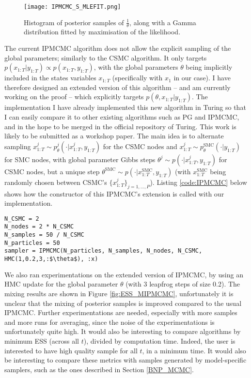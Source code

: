 \begin{figure}[h!]
\centering
\texttt{[image: IPMCMC\_S\_MLEFIT.png]}
    \caption{Histogram of posterior samples of $\frac{1}{\theta}$, along with a Gamma distribution fitted by maximisation of the likelihood.}
    \label{fig:IPMCMC_S_MLEFIT}
\end{figure}

The current \gls{IPMCMC} algorithm \cite{Rainforth:2016wq} does not allow the explicit sampling of the global parameters; similarly to the \acrlong{CSMC} algorithm. It only targets $ p(x_{1:T}|y_{1:T}) \propto p(x_{1:T},y_{1:T})$, with the global parameters $\theta$ being implicitly included in the states variables $x_{1:T}$ (specifically with $x_1$ in our case). I have therefore designed an extended version of this algorithm -- and am currently working on the proof -- which explicitly targets $p(\theta, x_{1:T}|y_{1:T})$. The implementation I have already implemented this new algorithm in Turing so that I can easily compare it to other existing algorithms such as \gls{PG} and \gls{IPMCMC}, and in the hope to be merged in the official repository of Turing.
This work is likely to be submitted as a workshop paper. The main idea is to alternate sampling $x^{j}_{1:T} \sim p_\theta^{j}(\cdot|x^j_{1:T},y_{1:T})$ for the \gls{CSMC} nodes and $x^{j}_{1:T} \sim p_\theta^{\text{SMC}}(\cdot|y_{1:T})$ for \gls{SMC} nodes, with global parameter Gibbs steps $\theta^j \sim p(\cdot|x^j_{1:T},y_{1:T})$ for \gls{CSMC} nodes, but a unique step $\theta^{\text{SMC}} \sim p(\cdot|x^\text{SMC}_{1:T},y_{1:T})$ (with $x^\text{SMC}_{1:T}$ being randomly chosen between \gls{CSMC}'s $\{x^j_{1:T}\}_{j=1,\dots,P}$).
Listing \ref{code:IPMCMC} below shows how the constructor of this \gls{IPMCMC}'s extension is called with our implementation.

\begin{lstlisting}[caption={Extension of IPMCMC sampler constructor written in Turing.jl.},captionpos=b,label=code:IPMCMC]
N_CSMC = 2
N_nodes = 2 * N_CSMC
N_samples = 50 / N_CSMC
N_particles = 50
sampler = IPMCMC(N_particles, N_samples, N_nodes, N_CSMC, HMC(1,0.2,3,:$\theta$), :x)
\end{lstlisting}

We also ran experimentations on the extended version of \gls{IPMCMC}, by using an \gls{HMC} update for the global parameter $\theta$ (with 3 leapfrog steps of size 0.2). The mixing results are shown in Figure \ref{fig:ESS_MIPMCMC}, unfortunately it is unclear that the mixing of posterior samples is improved compared to the usual \gls{IPMCMC}. Further experimentations are needed, especially with more samples and more runs for averaging, since the noise of the experimentations is unfortunately quite high. It would also be interesting to compare algorithms by minimum \gls{ESS} (across all $t$), divided by computation time. Indeed, the user is interested to have high quality sample for all $t$, in a minimum time. It would also be interesting to compare these metrics with samples generated by model-specific samplers, such as the ones described in Section \ref{BNP_MCMC}.

